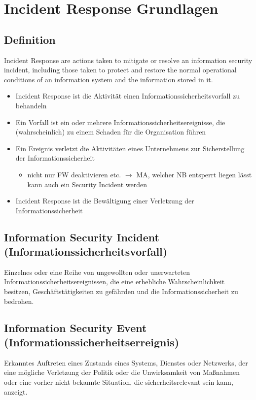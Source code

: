 \section{Incident Response Grundlagen}

\subsection{Definition}
Incident Response are actions taken to mitigate or resolve an information security incident, including those taken to protect and restore the normal operational conditions of an information system and the information stored in it.

\begin{itemize}
    \item Incident Response ist die Aktivität einen Informationssicherheitsvorfall zu behandeln
    \item Ein Vorfall ist ein oder mehrere Informationssicherheitsereignisse, die (wahrscheinlich) zu einem Schaden für die Organisation führen
    \item Ein Ereignis verletzt die Aktivitäten eines Unternehmens zur Sicherstellung der Informationssicherheit
    \begin{itemize}
        \item nicht nur FW deaktivieren etc. $\rightarrow$ MA, welcher NB entsperrt liegen lässt kann auch ein Security Incident werden
    \end{itemize}
    \item Incident Response ist die Bewältigung einer Verletzung der Informationssicherheit

\end{itemize}

\subsection{Information Security Incident (Informationssicherheitsvorfall)}
Einzelnes oder eine Reihe von ungewollten oder unerwarteten Informationssicherheitsereignissen, die eine erhebliche Wahrscheinlichkeit besitzen, Geschäftstätigkeiten zu gefährden und die Informationssicherheit zu bedrohen.

\subsection{Information Security Event (Informationssicherheitserreignis)}
Erkanntes Auftreten eines Zustands eines Systems, Dienstes oder Netzwerks, der eine mögliche Verletzung der Politik oder die Unwirksamkeit von Maßnahmen oder eine vorher nicht bekannte Situation, die sicherheitsrelevant sein kann, anzeigt.

